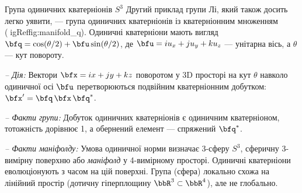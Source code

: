 
\begin{fexample}	{Група одиничних кватерніонів $S^3$}
\label{ex:S3_intro}
Другий приклад групи Лі, який також досить легко уявити, — група одиничних кватерніонів із кватерніонним множенням (igRef{fig:manifold_q}).
Одиничні кватерніони мають вигляд $
\bfq=\cos(\theta/2)+\bfu\sin(\theta/2)$, де $
\bfu=iu_x+ju_y+ku_z$ — унітарна вісь, а $
\theta$ — кут повороту.

\emph{-- Дія:}
Вектори $
\bfx=ix+jy+kz$ поворотом у 3D просторі на кут $
\theta$ навколо одиничної осі $
\bfu$ перетворюються подвійним кватерніонним добутком: $
\bfx'=\bfq\,\bfx\,\bfq^*$.

\emph{-- Факти групи:} 
Добуток одиничних кватерніонів є одиничним кватерніоном, тотожність дорівнює 1, а обернений елемент — спряжений $
\bfq^*$.

\emph{-- Факти маніфолду:} 
Умова одиничної норми визначає 3-сферу $S^3$, сферичну 3-вимірну поверхню або 
\emph{маніфолд} у 4-вимірному просторі.
Одиничні кватерніони еволюціонують з часом на цій поверхні.
Група (сфера) локально схожа на лінійний простір (дотичну гіперплощину $
\bbR^3\subset\bbR^4$), але не глобально.
\end{fexample}

